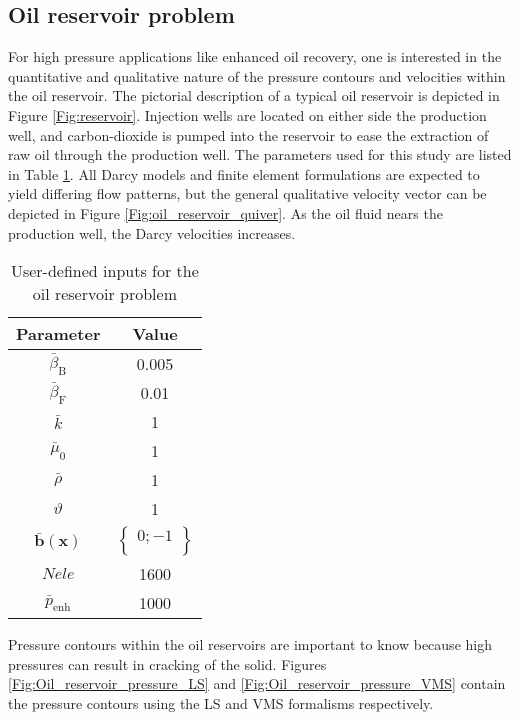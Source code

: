 \documentclass[11pt,reqno]{amsart}
\begin{document}
\subsection{Oil reservoir problem}
For high pressure applications like enhanced oil 
recovery, one is interested in the quantitative 
and qualitative nature of the pressure contours 
and velocities within the oil reservoir. The 
pictorial description of a typical oil reservoir 
is depicted in Figure \ref{Fig:reservoir}. Injection 
wells are located on either side the production well, 
and carbon-dioxide is pumped into the reservoir to 
ease the extraction of raw oil through the production 
well. The parameters used for this study are listed 
in Table \ref{Tab:oil_reservoir}. All Darcy models 
and finite element formulations are expected to yield 
differing flow patterns, but the general qualitative 
velocity vector can be depicted in Figure 
\ref{Fig:oil_reservoir_quiver}. As the oil fluid 
nears the production well, the Darcy velocities 
increases.
\begin{table}[h!]
  \centering
  \caption{User-defined inputs for the oil reservoir problem}
  \begin{tabular}{cc}
    \hline
    Parameter & Value \\ \hline
    $\bar{\beta}_{\mathrm{B}}$ & 0.005\\
    $\bar{\beta}_{\mathrm{F}}$ & 0.01\\	
    $\bar{k}$ & 1\\
    $\bar{\mu}_0$ & 1\\
    $\bar{\rho}$ & 1 \\
    $\vartheta$ & 1 \\
    $\bar{\mathbf{b}}(\mathbf{x})$ & $\begin{Bmatrix}0;-1\\ \end{Bmatrix} $\\
    $Nele$ & 1600\\
    $\bar{p}_{\mathrm{enh}}$ & 1000\\
    \hline
  \end{tabular}
  \label{Tab:oil_reservoir}
\end{table}
Pressure contours within the oil reservoirs are important to know because high pressures can result 
in cracking of the solid. Figures \ref{Fig:Oil_reservoir_pressure_LS} and 
\ref{Fig:Oil_reservoir_pressure_VMS} contain the pressure contours using the LS and VMS formalisms respectively.
\end{document}
